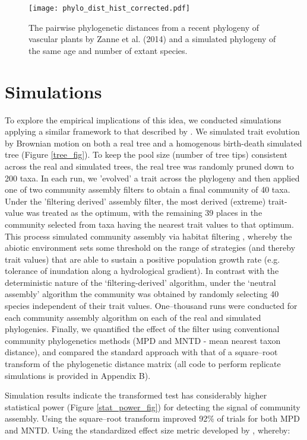 \begin{figure}[H]
\centering
\texttt{[image: phylo\_dist\_hist\_corrected.pdf]}
\caption{The pairwise phylogenetic distances from a recent phylogeny of vascular plants by Zanne et al. (2014) and a simulated phylogeny 
of the same age and number of
extant species.}
\label{phylo_dist_hist}
\end{figure} 

\section{Simulations}

To explore the empirical implications of this idea, we conducted simulations applying a similar framework to that described by \citet[][in this case repeating the `filtering-derived' and `neutral assembly' algorithms]{kraft2007}. We simulated trait evolution by Brownian motion on both a real tree and a homogenous birth-death simulated tree (Figure \ref{tree_fig}). To keep the pool size (number of tree tips) consistent across the real and simulated trees, the real tree was randomly pruned down to 200 taxa. In each run, we 'evolved' a trait across the phylogeny and then applied one of two community assembly filters to obtain a final community of 40 taxa. Under the 'filtering derived' assembly filter, the most derived (extreme) trait-value was treated as the optimum, with the remaining 39 places in the community selected from taxa having the nearest trait values to that optimum. This process simulated  community assembly via habitat filtering \citep{Diaz1998}, whereby the abiotic environment sets some threshold on the range of strategies (and thereby trait values) that are able to sustain a positive population growth rate (e.g. tolerance of inundation along a hydrological gradient). In contrast with the deterministic nature of the `filtering-derived' algorithm, under the `neutral assembly' algorithm the community was obtained by randomly selecting 40 species independent of their trait values. One--thousand runs were conducted for each community assembly algorithm on each of the real and simulated phylogenies. Finally, we quantified the effect of the filter using conventional community phylogenetics methods (MPD and MNTD - mean nearest taxon distance), and compared the standard approach with that of a square--root transform of the phylogenetic distance matrix (all code to perform replicate simulations is provided in Appendix B). 

Simulation results indicate the transformed test has considerably higher statistical power (Figure 
\ref{stat_power_fig}) for detecting the signal of community assembly. Using 
the square--root transform improved 92\% of trials for both MPD and MNTD. Using the standardized effect size metric developed by 
\cite{Webb2000}, whereby:

